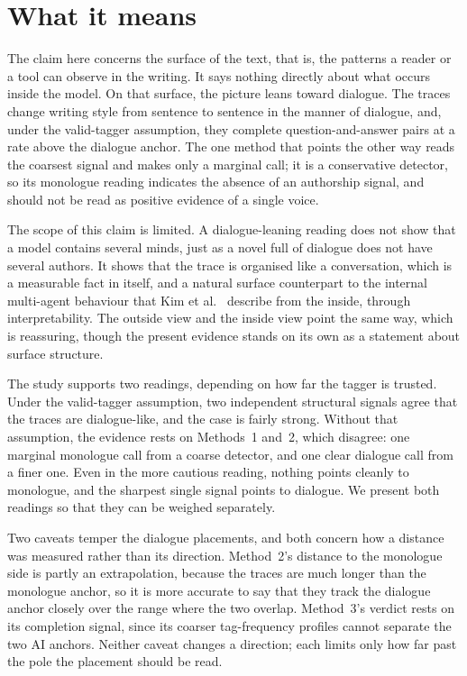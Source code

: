 \documentclass[10pt,twocolumn]{article}
\begin{document}
\section{What it means}
The claim here concerns the surface of the text, that is, the patterns a reader or a tool can observe
in the writing. It says nothing directly about what occurs inside the model. On that surface, the
picture leans toward dialogue. The traces change writing style from sentence to sentence in the manner
of dialogue, and, under the valid-tagger assumption, they complete question-and-answer pairs at a rate
above the dialogue anchor. The one method that points the other way reads the coarsest signal and
makes only a marginal call; it is a conservative detector, so its monologue reading indicates the
absence of an authorship signal, and should not be read as positive evidence of a single voice.

The scope of this claim is limited. A dialogue-leaning reading does not show that a model contains
several minds, just as a novel full of dialogue does not have several authors. It shows that the trace
is organised like a conversation, which is a measurable fact in itself, and a natural surface
counterpart to the internal multi-agent behaviour that Kim et al.~\cite{kim2026} describe from the
inside, through interpretability. The outside view and the inside view point the same way, which is
reassuring, though the present evidence stands on its own as a statement about surface structure.

The study supports two readings, depending on how far the tagger is trusted. Under the valid-tagger
assumption, two independent structural signals agree that the traces are dialogue-like, and the case
is fairly strong. Without that assumption, the evidence rests on Methods~1 and~2, which disagree: one
marginal monologue call from a coarse detector, and one clear dialogue call from a finer one. Even in
the more cautious reading, nothing points cleanly to monologue, and the sharpest single signal points
to dialogue. We present both readings so that they can be weighed separately.

Two caveats temper the dialogue placements, and both concern how a distance was measured rather than
its direction. Method~2's distance to the monologue side is partly an extrapolation, because the
traces are much longer than the monologue anchor, so it is more accurate to say that they track the
dialogue anchor closely over the range where the two overlap. Method~3's verdict rests on its
completion signal, since its coarser tag-frequency profiles cannot separate the two AI anchors.
Neither caveat changes a direction; each limits only how far past the pole the placement should be
read.
\end{document}
